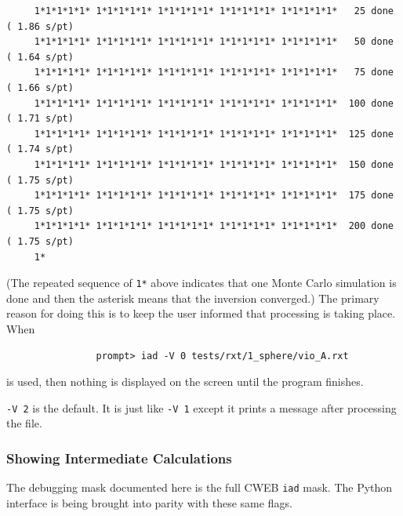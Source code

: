 \documentclass{article}
\begin{document}
{\scriptsize\begin{verbatim}
     1*1*1*1*1* 1*1*1*1*1* 1*1*1*1*1* 1*1*1*1*1* 1*1*1*1*1*   25 done ( 1.86 s/pt)
     1*1*1*1*1* 1*1*1*1*1* 1*1*1*1*1* 1*1*1*1*1* 1*1*1*1*1*   50 done ( 1.64 s/pt)
     1*1*1*1*1* 1*1*1*1*1* 1*1*1*1*1* 1*1*1*1*1* 1*1*1*1*1*   75 done ( 1.66 s/pt)
     1*1*1*1*1* 1*1*1*1*1* 1*1*1*1*1* 1*1*1*1*1* 1*1*1*1*1*  100 done ( 1.71 s/pt)
     1*1*1*1*1* 1*1*1*1*1* 1*1*1*1*1* 1*1*1*1*1* 1*1*1*1*1*  125 done ( 1.74 s/pt)
     1*1*1*1*1* 1*1*1*1*1* 1*1*1*1*1* 1*1*1*1*1* 1*1*1*1*1*  150 done ( 1.75 s/pt)
     1*1*1*1*1* 1*1*1*1*1* 1*1*1*1*1* 1*1*1*1*1* 1*1*1*1*1*  175 done ( 1.75 s/pt)
     1*1*1*1*1* 1*1*1*1*1* 1*1*1*1*1* 1*1*1*1*1* 1*1*1*1*1*  200 done ( 1.75 s/pt)
     1*
\end{verbatim}
}

\noindent
(The repeated sequence of \texttt{1*} above indicates that one Monte
Carlo simulation is done and then the asterisk means that the inversion
converged.) The primary reason for doing this is to keep the user informed that processing
is taking place.  When 
\begin{verbatim}
                prompt> iad -V 0 tests/rxt/1_sphere/vio_A.rxt
\end{verbatim}
is used, then nothing is displayed on the screen until the program finishes.

\texttt{-V 2} is the default.  It is just like \texttt{-V 1} except it
prints a message after processing the file.

\subsubsection{Showing Intermediate Calculations}

The debugging mask documented here is the full CWEB \texttt{iad} mask.  The
Python interface is being brought into parity with these same flags.
\end{document}
